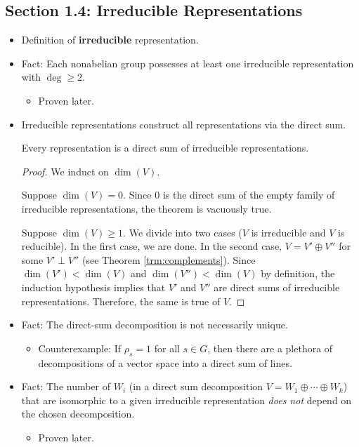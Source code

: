 \documentclass[../notes.tex]{subfiles}
\begin{document}
\subsection*{Section 1.4: Irreducible Representations}
\begin{itemize}
    \item Definition of \textbf{irreducible} representation.
    \item Fact: Each nonabelian group possesses at least one irreducible representation with $\deg\geq 2$.
    \begin{itemize}
        \item Proven later.
    \end{itemize}
    \item Irreducible representations construct all representations via the direct sum.
    \begin{theorem}\label{trm:dirSumIrrep}
        Every representation is a direct sum of irreducible representations.
        \begin{proof}
            We induct on $\dim(V)$.\par
            Suppose $\dim(V)=0$. Since 0 is the direct sum of the empty family of irreducible representations, the theorem is vacuously true.\par
            Suppose $\dim(V)\geq 1$. We divide into two cases ($V$ is irreducible and $V$ is reducible). In the first case, we are done. In the second case, $V=V'\oplus V''$ for some $V'\perp V''$ (see Theorem \ref{trm:complements}). Since $\dim(V')<\dim(V)$ and $\dim(V'')<\dim(V)$ by definition, the induction hypothesis implies that $V'$ and $V''$ are direct sums of irreducible representations. Therefore, the same is true of $V$.
        \end{proof}
    \end{theorem}
    \item Fact: The direct-sum decomposition is not necessarily unique.
    \begin{itemize}
        \item Counterexample: If $\rho_s=1$ for all $s\in G$, then there are a plethora of decompositions of a vector space into a direct sum of lines.
    \end{itemize}
    \item Fact: The number of $W_i$ (in a direct sum decomposition $V=W_1\oplus\cdots\oplus W_k$) that are isomorphic to a given irreducible representation \emph{does not} depend on the chosen decomposition.
    \begin{itemize}
        \item Proven later.
    \end{itemize}
\end{itemize}
\end{document}
